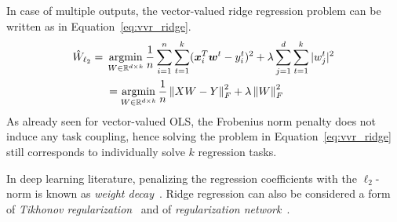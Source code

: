 			In case of multiple outputs, the vector-valued ridge regression problem can be written as in Equation~\eqref{eq:vvr_ridge}.
			\begin{equation} \label{eq:vvr_ridge}
				\begin{aligned}
					\hat W_{\ell_2}={} & \mathop{\mathrm{argmin}}\limits_{W \in \mathbb{R}^{d \times k}} \frac{1}{n} \sum_{i=1}^n \sum_{t=1}^k (\bm{x}_i^T\bm{w}^t - y_i^t)^2  + \lambda \sum_{j=1}^d \sum_{t=1}^k |w_j^t|^2\\
					& =	\mathop{\mathrm{argmin}}\limits_{W \in \mathbb{R}^{d \times k}} \frac{1}{n} \left\lVert XW - Y\right\rVert_F^2 + \lambda \left\lVert W\right\rVert_F^2
				\end{aligned}
			\end{equation}
			As already seen for vector-valued OLS, the Frobenius norm penalty does not induce any task coupling, hence solving the problem in Equation~\eqref{eq:vvr_ridge} still corresponds to individually solve $k$ regression tasks.

			In deep learning literature, penalizing the regression coefficients with the $\ell_2$-norm is known as \textit{weight decay}~\cite{krogh1992simple}. Ridge regression can also be considered a form of  \textit{Tikhonov regularization}~\cite{tikhonov1963solution} and of \textit{regularization network}~\cite{evgeniou2000regularization}.

